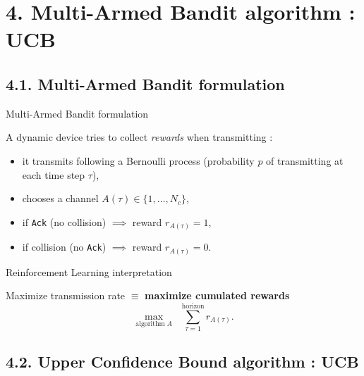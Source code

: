 \documentclass[12pt,english,ignorenonframetext,]{beamer}
\providecommand{\tightlist}{%
  \setlength{\itemsep}{0pt}\setlength{\parskip}{0pt}}
\begin{document}
\section{\hfill{}4. Multi-Armed Bandit algorithm : UCB\hfill{}}

\subsection{\hfill{}4.1. Multi-Armed Bandit formulation\hfill{}}

\begin{frame}[fragile]{Multi-Armed Bandit formulation}

A dynamic device tries to collect \emph{rewards} when transmitting :

\begin{itemize}
\tightlist
\item
  it transmits following a Bernoulli process \newline
   (probability \(p\) of transmitting at each time step \(\tau\)),
\item
  chooses a channel \(A(\tau) \in \{1,\dots,N_c\}\),
\item
  if \texttt{Ack} (no collision) \hspace*{10pt} \(\implies\) reward
  \(r_{A(\tau)} = 1\),
\item
  if collision (no \texttt{Ack}) \hspace*{10pt} \(\implies\) reward
  \(r_{A(\tau)} = 0\).
\end{itemize}

\pause

\begin{block}{Reinforcement Learning interpretation}

Maximize transmission rate \(\equiv\) \textbf{maximize cumulated
rewards}
\[\max_{\text{algorithm}\;A} \;\; \sum_{\tau=1}^{\text{horizon}} r_{A(\tau)}.\]

\end{block}

\end{frame}

\subsection{\hfill{}4.2. Upper Confidence Bound algorithm : UCB\hfill{}}
\end{document}
